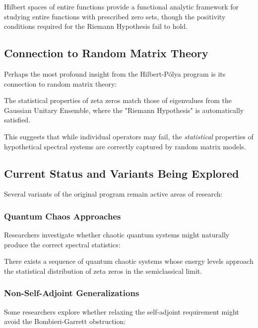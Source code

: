 \begin{theorem}
\label{thm:de_branges_theory}
Hilbert spaces of entire functions provide a functional analytic framework for studying entire functions with prescribed zero sets, though the positivity conditions required for the Riemann Hypothesis fail to hold.
\end{theorem}

\subsection{Connection to Random Matrix Theory}

Perhaps the most profound insight from the Hilbert-Pólya program is its connection to random matrix theory:

\begin{theorem}
\label{thm:statistical_correspondence}
The statistical properties of zeta zeros match those of eigenvalues from the Gaussian Unitary Ensemble, where the "Riemann Hypothesis" is automatically satisfied.
\end{theorem}

This suggests that while individual operators may fail, the \emph{statistical} properties of hypothetical spectral systems are correctly captured by random matrix models.

\subsection{Current Status and Variants Being Explored}

Several variants of the original program remain active areas of research:

\subsubsection{Quantum Chaos Approaches}
Researchers investigate whether chaotic quantum systems might naturally produce the correct spectral statistics:

\begin{conjecture}
There exists a sequence of quantum chaotic systems whose energy levels approach the statistical distribution of zeta zeros in the semiclassical limit.
\end{conjecture}

\subsubsection{Non-Self-Adjoint Generalizations}
Some researchers explore whether relaxing the self-adjoint requirement might avoid the Bombieri-Garrett obstruction:

